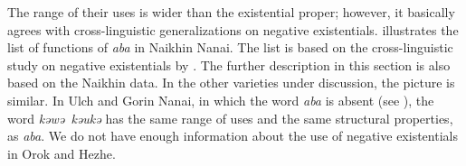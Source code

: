 \documentclass[output=paper]{langscibook}
\begin{document}

The range of their uses is wider than the existential proper; however, it basically agrees with cross-linguistic generalizations on negative existentials.  illustrates the list of functions of \textit{aba} in Naikhin Nanai. The list is based on the cross-linguistic study on negative existentials by \citet{Veselinova2013}. The further description in this section is also based on the Naikhin data. In the other varieties under discussion, the picture is similar. In Ulch and Gorin Nanai, in which the word \textit{aba} is absent (see ), the word \textit{kəwə~kəukə} has the same range of uses and the same structural properties, as \textit{aba}. We do not have enough information about the use of negative existentials in Orok and Hezhe.
\end{document}
